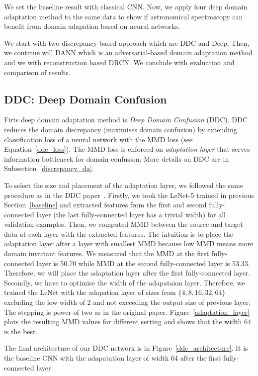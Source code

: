 We set the baseline result with classical CNN.
Now, we apply four deep domain adaptation method to the same data
to show if astronomical spectroscopy can benefit from domain adapation
based on neural networks.

We start with two discrepancy-based approach which are DDC and Deep.
Then, we continue will DANN
which is an adversarial-based domain adaptation method
and we with reconstruction based DRCN.
We conclude with evaluation and comparison of results.

\subsection{DDC: Deep Domain Confusion}

Firts deep domain adaptation method is \textit{Deep Domain Confusion} (DDC).
DDC reduces the domain discrepancy (maximises domain confusion)
by extending classification loss of a neural network with the MMD loss
(see Equation~\ref{ddc_loss}).
The MMD loss is enforced on \textit{adaptation layer}
that serves information bottleneck for domain confusion.
More details on DDC are in Subsection~\ref{discrepancy_da}.

To select the size and placement of the adaptation layer,
we followed the same procedure as in the DDC paper~\cite{tzeng2014}.
Firstly, we took the LeNet-5 trained in previous Section~\ref{baseline}
and extracted features from the first and second fully-connected layer
(the last fully-connected layer has a trivial width)
for all validation examples.
Then, we computed MMD between the source and target data at each layer with the extracted features.
The intuition is to place the adaptation layer after a layer with smallest MMD
because low MMD means more domain invariant features.
We measured that the MMD at the first fully-connected layer is 50.70
while MMD at the second fully-connected layer is 53.33.
Therefore, we will place the adaptation layer after the first fully-connected layer.
Secondly, we have to optimise the width of the adapataion layer.
Therefore, we trained the LeNet with the adapation layer of sizes
from \(\{4, 8, 16, 32, 64\}\) excluding the low width of 2
and not exceeding the output size of previous layer.
The stepping is power of two as in the original paper.
Figure~\ref{adaptation_layer} plots the resulting MMD values for different setting
and shows that the width 64 is the best.

The final architecture of our DDC network is in Figure~\ref{ddc_architecture}.
It is the baseline CNN with the adapatation layer of width 64
after the first fully-connected layer.

